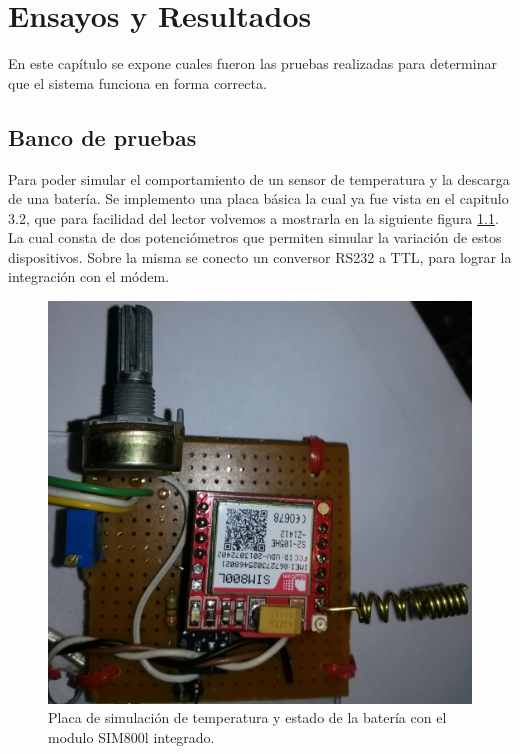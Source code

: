 \chapter{Ensayos y Resultados} %
En este capítulo se expone cuales fueron las pruebas realizadas para determinar que el sistema funciona en forma correcta.
\label{Chapter4} %

\section{Banco de pruebas}
Para poder simular el comportamiento de un sensor de temperatura y la descarga de una batería. Se implemento una placa básica la cual ya fue vista en el capitulo 3.2, que para facilidad del lector volvemos a mostrarla en la siguiente figura \ref{fig:placa_básica}. La cual consta de dos potenciómetros que permiten simular la variación de estos dispositivos. Sobre la misma se conecto un conversor RS232 a TTL, para lograr la integración con el módem.

\begin{figure}[h]
  \centering
  \includegraphics[scale=.03]{./Figures/placa_basica.jpg}
  \caption{Placa de simulación de temperatura y estado de la batería con el modulo SIM800l integrado.}
  \label{fig:placa_básica}
\end{figure}

